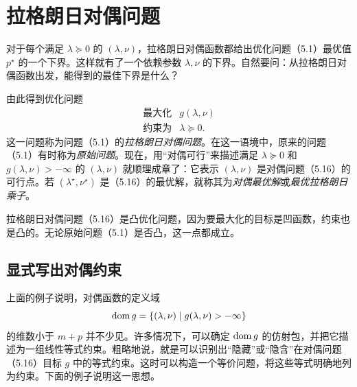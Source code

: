 \section{拉格朗日对偶问题}
对于每个满足 $\lambda\succeq0$ 的 $(\lambda,\nu)$，拉格朗日对偶函数都给出优化问题（5.1）最优值 $p^\star$ 的一个下界。这样就有了一个依赖参数 $\lambda,\nu$ 的下界。自然要问：从拉格朗日对偶函数出发，能得到的最佳下界是什么？

由此得到优化问题
\begin{equation}
\begin{array}{ll}\text{最大化}&g(\lambda,\nu)\\
\text{约束为}&\lambda\succeq0.\end{array}\tag{5.16}
\end{equation}
这一问题称为问题（5.1）的\emph{拉格朗日对偶问题}。在这一语境中，原来的问题（5.1）有时称为\emph{原始问题}。现在，用“对偶可行”来描述满足 $\lambda\succeq0$ 和 $g(\lambda,\nu)>-\infty$ 的 $(\lambda,\nu)$ 就顺理成章了：它表示 $(\lambda,\nu)$ 是对偶问题（5.16）的可行点。若 $(\lambda^\star,\nu^\star)$ 是（5.16）的最优解，就称其为\emph{对偶最优解}或\emph{最优拉格朗日乘子}。

拉格朗日对偶问题（5.16）是凸优化问题，因为要最大化的目标是凹函数，约束也是凸的。无论原始问题（5.1）是否凸，这一点都成立。

\subsection{显式写出对偶约束}
上面的例子说明，对偶函数的定义域
\[
\operatorname{dom} g=\{(\lambda,\nu)\mid g(\lambda,\nu)>-\infty\}
\]
的维数小于 $m+p$ 并不少见。许多情况下，可以确定 $\operatorname{dom} g$ 的仿射包，并把它描述为一组线性等式约束。粗略地说，就是可以识别出“隐藏”或“隐含”在对偶问题（5.16）目标 $g$ 中的等式约束。这时可以构造一个等价问题，将这些等式明确地列为约束。下面的例子说明这一思想。

